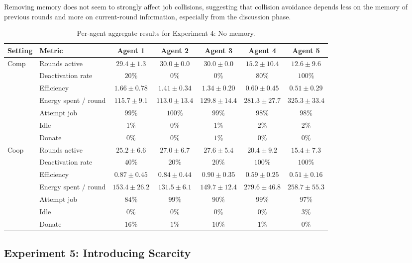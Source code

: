 \documentclass[sigconf,nonacm]{acmart}
\begin{document}
Removing memory does not seem to strongly affect job collisions, suggesting that collision avoidance depends less on the memory of previous rounds and more on current-round information, especially from the discussion phase.

\begin{table}[t]
\centering
\small
\setlength{\tabcolsep}{4pt}
\begin{tabular}{llccccc}
\toprule
Setting & Metric & Agent 1 & Agent 2 & Agent 3 & Agent 4 & Agent 5 \\
\midrule
\multirow{7}{*}{Comp}
& Rounds active
& $29.4 \pm 1.3$ & $30.0 \pm 0.0$ & $30.0 \pm 0.0$ & $15.2 \pm 10.4$ & $12.6 \pm 9.6$ \\
& Deactivation rate
& $20\%$ & $0\%$ & $0\%$ & $80\%$ & $100\%$ \\
& Efficiency
& $1.66 \pm 0.78$ & $1.41 \pm 0.34$ & $1.34 \pm 0.20$ & $0.60 \pm 0.45$ & $0.51 \pm 0.29$ \\
& Energy spent / round
& $115.7 \pm 9.1$ & $113.0 \pm 13.4$ & $129.8 \pm 14.4$ & $281.3 \pm 27.7$ & $325.3 \pm 33.4$ \\
& Attempt job
& $99\%$ & $100\%$ & $99\%$ & $98\%$ & $98\%$ \\
& Idle
& $1\%$ & $0\%$ & $1\%$ & $2\%$ & $2\%$ \\
& Donate
& $0\%$ & $0\%$ & $1\%$ & $0\%$ & $0\%$ \\
\midrule
\multirow{7}{*}{Coop}
& Rounds active
& $25.2 \pm 6.6$ & $27.0 \pm 6.7$ & $27.6 \pm 5.4$ & $20.4 \pm 9.2$ & $15.4 \pm 7.3$ \\
& Deactivation rate
& $40\%$ & $20\%$ & $20\%$ & $100\%$ & $100\%$ \\
& Efficiency
& $0.87 \pm 0.45$ & $0.84 \pm 0.44$ & $0.90 \pm 0.35$ & $0.59 \pm 0.25$ & $0.51 \pm 0.16$ \\
& Energy spent / round
& $153.4 \pm 26.2$ & $131.5 \pm 6.1$ & $149.7 \pm 12.4$ & $279.6 \pm 46.8$ & $258.7 \pm 55.3$ \\
& Attempt job
& $84\%$ & $99\%$ & $90\%$ & $99\%$ & $97\%$ \\
& Idle
& $0\%$ & $0\%$ & $0\%$ & $0\%$ & $3\%$ \\
& Donate
& $16\%$ & $1\%$ & $10\%$ & $1\%$ & $0\%$ \\
\bottomrule
\end{tabular}
\caption{Per-agent aggregate results for Experiment 4: No memory.}
\label{tab:no_memory_big_table}
\end{table}

\subsection{Experiment 5: Introducing Scarcity}
\end{document}
